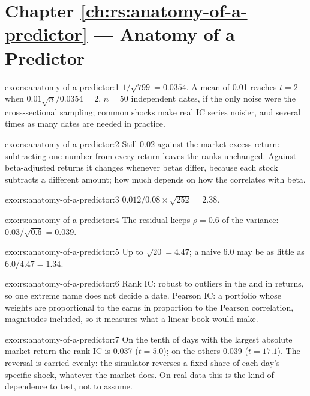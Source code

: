 \section*{Chapter \ref{ch:rs:anatomy-of-a-predictor} --- Anatomy of a Predictor}

\begin{solution}{exo:rs:anatomy-of-a-predictor:1}
$1/\sqrt{799} = 0.0354$. A mean of 0.01 reaches $t = 2$ when $0.01\sqrt n/0.0354 = 2$, $n = 50$ independent dates, if the only noise
were the cross-sectional sampling; common shocks make real IC series noisier, and several times as many dates are needed in practice.
\end{solution}

\begin{solution}{exo:rs:anatomy-of-a-predictor:2}
Still 0.02 against the market-excess return: subtracting one number from every return leaves the ranks unchanged. Against
beta-adjusted returns it changes whenever betas differ, because each stock subtracts a different amount; how much depends on how
the  correlates with beta.
\end{solution}

\begin{solution}{exo:rs:anatomy-of-a-predictor:3}
$0.012/0.08 \times \sqrt{252} = 2.38$.
\end{solution}

\begin{solution}{exo:rs:anatomy-of-a-predictor:4}
The residual keeps $\rho = 0.6$ of the variance: $0.03/\sqrt{0.6} = 0.039$.
\end{solution}

\begin{solution}{exo:rs:anatomy-of-a-predictor:5}
Up to $\sqrt{20} = 4.47$; a naive 6.0 may be as little as $6.0/4.47 = 1.34$.
\end{solution}

\begin{solution}{exo:rs:anatomy-of-a-predictor:6}
Rank IC: robust to outliers in the  and in returns, so one extreme name does not decide a date. Pearson IC: a portfolio whose
weights are proportional to the  earns in proportion to the Pearson correlation, magnitudes included, so it measures what a
linear book would make.
\end{solution}

\begin{solution}{exo:rs:anatomy-of-a-predictor:7}
On the tenth of days with the largest absolute market return the rank IC is 0.037 ($t = 5.0$); on the others 0.039 ($t = 17.1$). The
reversal is carried evenly: the simulator reverses a fixed share of each day's specific shock, whatever the market does. On real data
this is the kind of dependence to test, not to assume.
\end{solution}

